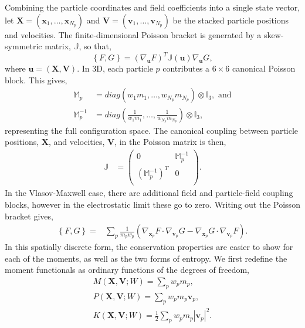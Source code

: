 \documentclass[preprint,12pt]{elsarticle}
\theoremstyle{definition}
\begin{document}
Combining the particle coordinates and field coefficients into a single state vector, let $\mathbf{X}=(\boldsymbol{x}_1,\dots,\boldsymbol{x}_{N_p})$ and $\mathbf{V}=(\boldsymbol{v}_1,\dots,\boldsymbol{v}_{N_p})$ be the stacked particle positions and velocities. The finite‐dimensional Poisson bracket is generated by a skew-symmetric matrix, $\mathbb{J}$, so that,
\begin{equation}
  \left\{F,G\right\} = \left(\nabla_{\boldsymbol{u}} F\right)^{T} \mathbb{J}(\boldsymbol{u}) \nabla_{\boldsymbol{u}} G,\label{eq:discPoissonBracket}
\end{equation}
where $\boldsymbol{u}=\left(\boldsymbol{X},\boldsymbol{V}\right)$. In 3D, each particle $p$ contributes a $6\times6$ canonical Poisson block. This gives, \begin{align}
        \mathbb{M}_p &= diag\left(w_1 m_1,\ldots,w_{N_p} m_{N_p}\right) \otimes \mathbb{I}_3,\text{ and} \\
        \mathbb{M}_p^{-1} &= diag \left(\frac{1}{w_1 m_1},\ldots,\frac{1}{w_{N_p} m_{N_p}}\right) \otimes \mathbb{I}_3,
    \end{align}
representing the full configuration space.
The canonical coupling between particle positions, $\mathbf{X}$, and velocities, $\mathbf{V}$, in the Poisson matrix is then, 
\begin{align}
    \mathbb{J} &= \begin{pmatrix}
        0 & \mathbb{M}_p^{-1} \\
        (\mathbb{M}_p^{-1})^T & 0 \\
    \end{pmatrix}.
\end{align}
In the Vlasov-Maxwell case, there are additional field and particle-field coupling blocks, however in the electrostatic limit these go to zero. 
Writing out the Poisson bracket gives, 
\begin{align}
    \left\{F,G\right\} = &\sum_p \frac{1}{m_p w_p}\left(\nabla_{\boldsymbol{x}_p} F \cdot \nabla_{\boldsymbol{v}_p} G - \nabla_{\boldsymbol{x}_p} G \cdot \nabla_{\boldsymbol{v}_p} F \right).\label{eq:DiscPoissonBracketPointwise}
\end{align}
In this spatially discrete form, the conservation properties are easier to show for each of the moments, as well as the two forms of entropy. We first redefine the moment functionals as ordinary functions of the degrees of freedom,
\begin{gather}
M(\boldsymbol{X}, \boldsymbol{V} ; W)=\sum_{p} w_{p} m_p, \label{eq:DiscMass}\\
P(\boldsymbol{X}, \boldsymbol{V} ; W)=\sum_{p} w_{p} m_p \boldsymbol{v}_{p}, \label{eq:DiscMomentum}\\
K(\boldsymbol{X}, \boldsymbol{V} ; W)=\frac{1}{2} \sum_{p} w_{p} m_p \left|\boldsymbol{v}_{p}\right|^{2}\label{eq:DiscKinEn}.
\end{gather}
\end{document}
